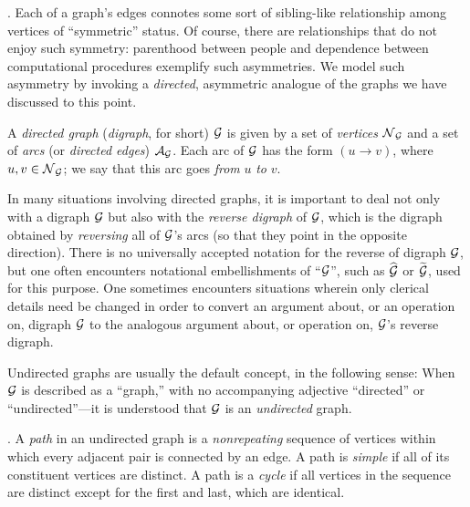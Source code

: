 \bigskip

 
 

.
Each of a graph's edges connotes some sort of sibling-like relationship among vertices of ``symmetric'' status.  Of course, there are relationships that do not enjoy such symmetry: parenthood between people and dependence between computational procedures exemplify such asymmetries.  We model such asymmetry by invoking a {\em directed}, asymmetric analogue of the graphs we have discussed to this point.

\smallskip

A {\it directed graph} ({\it digraph}, for short) $\mbox{$\cal G$}$ is given by a set of {\it vertices} $\mbox{$\cal N$}_{\mbox{{\scriptsize $\cal G$}}}$ and a set of {\it arcs} (or {\it directed edges}) $\mbox{$\cal A$}_{\mbox{{\scriptsize $\cal G$}}}$.  Each arc of $\mbox{$\cal G$}$ has the form $(u \rightarrow v)$, where $u, v \in \mbox{$\cal N$}_{\mbox{{\scriptsize $\cal G$}}}$; we say that this arc goes {\em from} $u$ {\em to} $v$.  

\smallskip

In many situations involving directed graphs, it is important to deal not only with a digraph $\mbox{$\cal G$}$
but also with the {\em reverse digraph} of $\mbox{$\cal G$}$, which is the digraph obtained by {\em reversing}
all of $\mbox{$\cal G$}$'s arcs (so that they point in the opposite direction).  There is no universally accepted 
notation for the reverse of digraph $\mbox{$\cal G$}$, but one often encounters notational embellishments of ``$\mbox{$\cal G$}$'', such as $\widehat{\mbox{$\cal G$}}$ or $\widetilde{\mbox{$\cal G$}}$, used for this purpose.  One sometimes encounters situations wherein only clerical details need be changed in order to convert an argument about, or an operation on, digraph $\mbox{$\cal G$}$  to the analogous argument  about, or operation on, $\mbox{$\cal G$}$'s reverse digraph. 

\medskip

Undirected graphs are usually the default concept, in the following sense: When $\mbox{$\cal G$}$ is described as a ``graph,'' with no accompanying adjective ``directed'' or ``undirected''---it is understood that $\mbox{$\cal G$}$ is an {\em undirected} graph.

\medskip

 
 
  

.
A {\em path} in an undirected graph is a {\em nonrepeating} sequence of vertices within which
every adjacent pair is connected by an edge.  A path is {\em simple} if all of its constituent vertices are distinct.  A path is a {\em cycle} if all vertices in the sequence are distinct except for the first and last, which are identical.  

